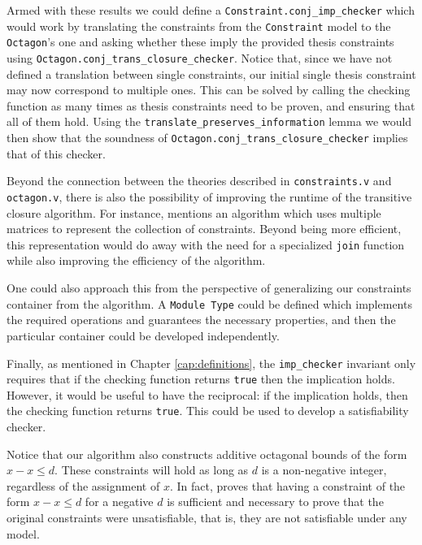 Armed with these results we could define a \texttt{Constraint.conj_imp_checker}
which would work by translating the constraints from the \texttt{Constraint} model to
the \texttt{Octagon}'s one and asking whether these imply the provided thesis constraints
using \texttt{Octagon.conj_trans_closure_checker}. Notice that, since we have not defined
a translation between single constraints, our initial single thesis constraint may now correspond
to multiple ones. This can be solved by calling the checking function as many times as thesis 
constraints need to be proven, and ensuring that all of them hold. Using the 
\texttt{translate_preserves_information} lemma we would then show that the soundness of 
\texttt{Octagon.conj_trans_closure_checker} implies that of this checker.

Beyond the connection between the theories described in \texttt{constraints.v} and 
\texttt{octagon.v}, there  is also the possibility of improving the runtime of the
transitive closure algorithm. For instance, \cite{TransitiveClosure} mentions an algorithm which
uses multiple matrices to represent the collection of constraints. Beyond being more efficient, 
this representation would do away with the need for a specialized \texttt{join} function
while also improving the efficiency of the algorithm.

One could also approach this from the perspective of generalizing our constraints container from
the algorithm. A \texttt{Module Type} could be defined which implements the required 
operations and guarantees the necessary properties, and then the particular container could be
developed independently.

Finally, as mentioned in Chapter \ref{cap:definitions}, the \texttt{imp_checker} invariant
only requires that if the checking function returns \texttt{true} then the implication
holds. However, it would be useful to have the reciprocal: if the implication holds, then the checking
function returns \texttt{true}. This could be used to develop a satisfiability checker.

Notice that our algorithm also constructs additive octagonal bounds of the form $x - x \le d$.
These constraints will hold as long as $d$ is a non-negative integer, regardless of the assignment
of $x$. In fact, \cite{HarveyStuckey} proves that having a constraint of the form $x - x \le d$
for a negative $d$ is sufficient and necessary to prove that the original constraints were 
unsatisfiable, that is, they are not satisfiable under any model.

